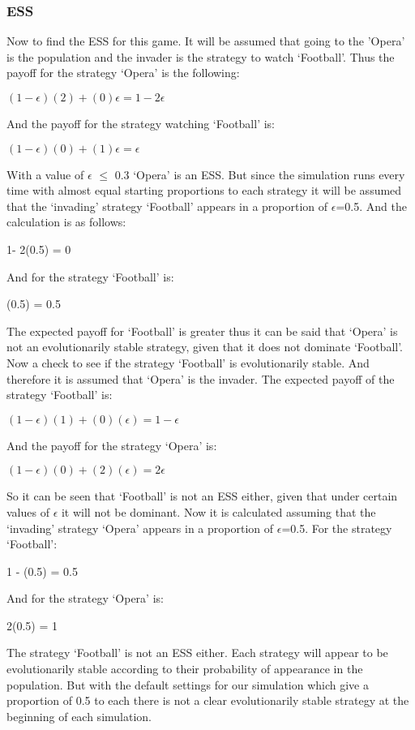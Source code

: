 \subsubsection{ESS}
Now to find the ESS for this game. It will be assumed that going to the 'Opera' is the population and the invader is the strategy to watch `Football'. Thus the payoff for the strategy `Opera' is the following:
\begin{center}
$(1-{\epsilon})(2) + (0){\epsilon} = 1 - 2{\epsilon}$
\end{center}
And the payoff for the strategy watching `Football' is:
\begin{center}
$(1-{\epsilon})(0) + (1){\epsilon} = {\epsilon}$
\end{center}
With a value of $\epsilon$ $\leq$ 0.3 `Opera' is an ESS. But since the simulation runs every time with almost equal starting proportions to each strategy it will be assumed that the `invading' strategy `Football' appears in a proportion of $\epsilon$=0.5. And the calculation is as follows:
\begin{center}
1- 2(0.5) = 0
\end{center}
And for the strategy `Football' is:
\begin{center}
 (0.5) = 0.5
\end{center}
The expected payoff for `Football' is greater thus it can be said that `Opera' is not an evolutionarily stable strategy, given that it does not dominate  `Football'.
Now a check to see if the strategy `Football' is evolutionarily stable. And therefore it is assumed that `Opera' is the invader. The expected payoff of the strategy `Football' is:
\begin{center}
$(1-{\epsilon})(1) + (0)({\epsilon}) = 1 - {\epsilon} $
\end{center}
And the payoff for the strategy `Opera' is:
\begin{center}
$(1-{\epsilon})(0) + (2)({\epsilon}) =  2{\epsilon}$
\end{center}
So it can be seen that `Football' is not an ESS either, given that under certain values of $\epsilon$ it will not be dominant. Now it is calculated assuming that the `invading' strategy `Opera' appears in a proportion of $\epsilon$=0.5. For the strategy `Football':
\begin{center}
1 -  (0.5) = 0.5
\end{center}
And for the strategy `Opera' is:
\begin{center}
 2(0.5)  = 1
\end{center}
The strategy `Football' is not an ESS either. Each strategy will appear to be evolutionarily stable according to their probability of appearance in the population. But with the default settings for our simulation which give a proportion of 0.5 to each there is not a clear evolutionarily stable strategy at the beginning of each simulation.



